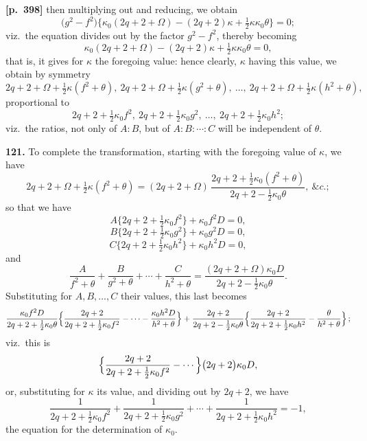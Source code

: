 \documentclass[11pt,a4paper]{article}
\begin{document}
\noindent\textbf{[p.~398]}\quad
then multiplying out and reducing, we obtain
\[
\bigl(g^{2} - f^{2}\bigr)\bigl\{\kappa_{0}(2q + 2 + \Omega) - (2q + 2)\kappa + \tfrac{1}{2}\kappa\kappa_{0}\theta\bigr\} = 0;
\]
viz.\ the equation divides out by the factor $g^{2} - f^{2}$, thereby becoming
\[
\kappa_{0}(2q + 2 + \Omega) - (2q + 2)\kappa + \tfrac{1}{2}\kappa\kappa_{0}\theta = 0,
\]
that is, it gives for $\kappa$ the foregoing value: hence clearly, $\kappa$ having this value, we obtain by symmetry
\[
2q + 2 + \Omega + \tfrac{1}{2}\kappa(f^{2}+\theta),\ 2q + 2 + \Omega + \tfrac{1}{2}\kappa(g^{2}+\theta),\ \ldots,\ 2q + 2 + \Omega + \tfrac{1}{2}\kappa(h^{2}+\theta),
\]
proportional to
\[
2q + 2 + \tfrac{1}{2}\kappa_{0} f^{2},\ 2q + 2 + \tfrac{1}{2}\kappa_{0} g^{2},\ \ldots,\ 2q + 2 + \tfrac{1}{2}\kappa_{0} h^{2};
\]
viz.\ the ratios, not only of $A : B$, but of $A : B : \cdots : C$ will be independent of $\theta$.

\textbf{121.} To complete the transformation, starting with the foregoing value of $\kappa$, we have
\[
2q + 2 + \Omega + \tfrac{1}{2}\kappa(f^{2}+\theta) = (2q + 2 + \Omega)\,\frac{2q + 2 + \tfrac{1}{2}\kappa_{0}(f^{2}+\theta)}{2q + 2 - \tfrac{1}{2}\kappa_{0}\theta},\ \&c.;
\]
so that we have
\[
A\bigl\{2q + 2 + \tfrac{1}{2}\kappa_{0} f^{2}\bigr\} + \kappa_{0} f^{2} D = 0,
\]
\[
B\bigl\{2q + 2 + \tfrac{1}{2}\kappa_{0} g^{2}\bigr\} + \kappa_{0} g^{2} D = 0,
\]
\[
C\bigl\{2q + 2 + \tfrac{1}{2}\kappa_{0} h^{2}\bigr\} + \kappa_{0} h^{2} D = 0,
\]
and
\[
\frac{A}{f^{2}+\theta} + \frac{B}{g^{2}+\theta} + \cdots + \frac{C}{h^{2}+\theta} = \frac{(2q + 2 + \Omega)\kappa_{0} D}{2q + 2 - \tfrac{1}{2}\kappa_{0}\theta}.
\]
Substituting for $A, B, \ldots, C$ their values, this last becomes
\[
\frac{\kappa_{0} f^{2} D}{2q + 2 + \tfrac{1}{2}\kappa_{0}\theta}\Bigl\{\frac{2q + 2}{2q + 2 + \tfrac{1}{2}\kappa_{0} f^{2}} - \cdots - \frac{\kappa_{0} h^{2} D}{h^{2}+\theta}\Bigr\}
+ \frac{2q + 2}{2q + 2 - \tfrac{1}{2}\kappa_{0}\theta}\Bigl\{\frac{2q + 2}{2q + 2 + \tfrac{1}{2}\kappa_{0} h^{2}} - \frac{\theta}{h^{2}+\theta}\Bigr\}\,;
\]
viz.\ this is
\[
\Bigl\{\frac{2q + 2}{2q + 2 + \tfrac{1}{2}\kappa_{0} f^{2}} - \cdots\Bigr\}\bigl(2q + 2\bigr)\kappa_{0} D,
\]
or, substituting for $\kappa$ its value, and dividing out by $2q + 2$, we have
\[
\frac{1}{2q + 2 + \tfrac{1}{2}\kappa_{0} f^{2}} + \frac{1}{2q + 2 + \tfrac{1}{2}\kappa_{0} g^{2}} + \cdots + \frac{1}{2q + 2 + \tfrac{1}{2}\kappa_{0} h^{2}} = -1,
\]
the equation for the determination of $\kappa_{0}$.
\end{document}
